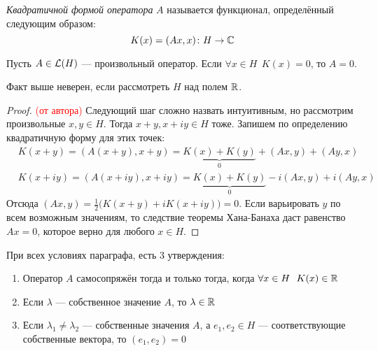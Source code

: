 \begin{definition}
	\textit{Квадратичной формой оператора} $A$ называется функционал, определённый следующим образом:
	\[
		K(x) = (Ax, x) \colon H \to \mathbb{C}
	\]
\end{definition}

\begin{proposition}
	Пусть $A \in \mathcal{L}(H)$ --- произвольный оператор. Если $\forall x \in H\ \ K(x) = 0$, то $A = 0$.
\end{proposition}

\begin{note}
	Факт выше неверен, если рассмотреть $H$ над полем $\mathbb{R}$.
\end{note}

\begin{proof} \textcolor{red}{(от автора)}
	Следующий шаг сложно назвать интуитивным, но рассмотрим произвольные $x, y \in H$. Тогда $x + y, x + iy \in H$ тоже. Запишем по определению квадратичную форму для этих точек:
	\begin{align*}
		&{K(x + y) = (A(x + y), x + y) = \underbrace{K(x) + K(y)}_{0} + (Ax, y) + (Ay, x)}
		\\
		&{K(x + iy) = (A(x + iy), x + iy) = \underbrace{K(x) + K(y)}_{0} - i(Ax, y) + i(Ay, x)}
	\end{align*}
	Отсюда $(Ax, y) = \frac{1}{2}\big(K(x + y) + iK(x + iy)\big) = 0$. Если варьировать $y$ по всем возможным значениям, то следствие теоремы Хана-Банаха даст равенство $Ax = 0$, которое верно для любого $x \in H$.
\end{proof}

\begin{theorem}
	При всех условиях параграфа, есть 3 утверждения:
	\begin{enumerate}
		\item Оператор $A$ самосопряжён тогда и только тогда, когда $\forall x \in H\ \ K(x) \in \mathbb{R}$
		
		\item Если $\lambda$ --- собственное значение $A$, то $\lambda \in \mathbb{R}$
		
		\item Если $\lambda_1 \neq \lambda_2$ --- собственные значения $A$, а $e_1, e_2 \in H$ --- соответствующие собственные вектора, то $(e_1, e_2) = 0$
	\end{enumerate}
\end{theorem}

